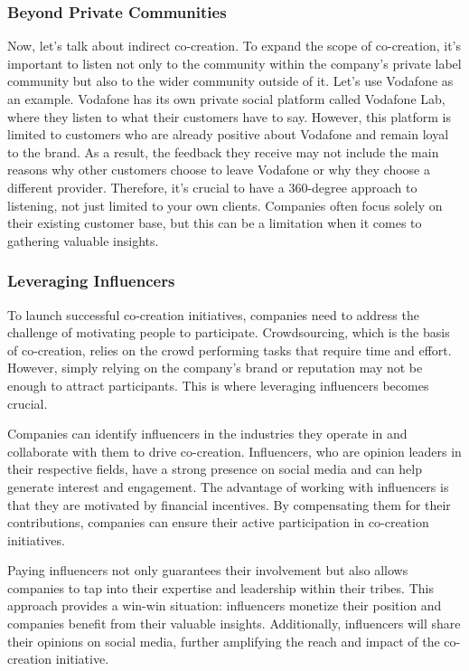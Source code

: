 \subsubsection{Beyond Private
  Communities}\label{beyond-private-communities}

Now, let's talk about indirect co-creation. To expand the scope of
co-creation, it's important to listen not only to the community within
the company's private label community but also to the wider community
outside of it. Let's use Vodafone as an example. Vodafone has its own
private social platform called Vodafone Lab, where they listen to what
their customers have to say. However, this platform is limited to
customers who are already positive about Vodafone and remain loyal to
the brand. As a result, the feedback they receive may not include the
main reasons why other customers choose to leave Vodafone or why they
choose a different provider. Therefore, it's crucial to have a
360-degree approach to listening, not just limited to your own clients.
Companies often focus solely on their existing customer base, but this
can be a limitation when it comes to gathering valuable insights.

\subsubsection{Leveraging Influencers}\label{leveraging-influencers}

To launch successful co-creation initiatives, companies need to address
the challenge of motivating people to participate. Crowdsourcing, which
is the basis of co-creation, relies on the crowd performing tasks that
require time and effort. However, simply relying on the company's brand
or reputation may not be enough to attract participants. This is where
leveraging influencers becomes crucial.

Companies can identify influencers in the industries they operate in and
collaborate with them to drive co-creation. Influencers, who are opinion
leaders in their respective fields, have a strong presence on social
media and can help generate interest and engagement. The advantage of
working with influencers is that they are motivated by financial
incentives. By compensating them for their contributions, companies can
ensure their active participation in co-creation initiatives.

Paying influencers not only guarantees their involvement but also allows
companies to tap into their expertise and leadership within their
tribes. This approach provides a win-win situation: influencers monetize
their position and companies benefit from their valuable insights.
Additionally, influencers will share their opinions on social media,
further amplifying the reach and impact of the co-creation initiative.

